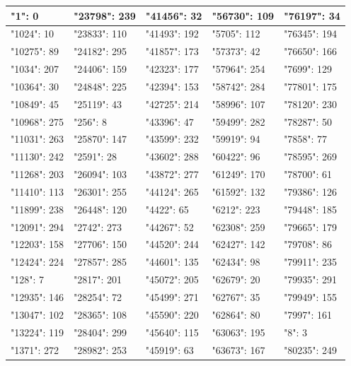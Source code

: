 \documentclass[11pt,letterpaper]{article}
\begin{document}
\begin{enumerate}[label=\alph*)]
\begin{itemize}
\begin{table}[H]
\begin{longtable}{|l|l|l|l|l|}
\hline
"1": 0        & "23798": 239   &  "41456": 32   & "56730": 109  & "76197": 34  \\ \hline
"1024": 10    & "23833": 110   &  "41493": 192  & "5705": 112   & "76345": 194 \\ \hline
"10275": 89   & "24182": 295   &  "41857": 173  & "57373": 42   & "76650": 166 \\ \hline
"1034": 207   & "24406": 159   &  "42323": 177  & "57964": 254  & "7699": 129  \\ \hline
"10364": 30   & "24848": 225   &  "42394": 153  & "58742": 284  & "77801": 175 \\ \hline
"10849": 45   & "25119": 43    &  "42725": 214  & "58996": 107  & "78120": 230 \\ \hline
"10968": 275  & "256": 8       &  "43396": 47   & "59499": 282  & "78287": 50  \\ \hline
"11031": 263  & "25870": 147   &  "43599": 232  & "59919": 94   & "7858": 77   \\ \hline
"11130": 242  & "2591": 28     &  "43602": 288  & "60422": 96   & "78595": 269 \\ \hline
"11268": 203  & "26094": 103   &  "43872": 277  & "61249": 170  & "78700": 61  \\ \hline
"11410": 113  & "26301": 255   &  "44124": 265  & "61592": 132  & "79386": 126 \\ \hline
"11899": 238  & "26448": 120   &  "4422": 65    & "6212": 223   & "79448": 185 \\ \hline
"12091": 294  & "2742": 273    &  "44267": 52   & "62308": 259  & "79665": 179 \\ \hline
"12203": 158  & "27706": 150   &  "44520": 244  & "62427": 142  & "79708": 86  \\ \hline
"12424": 224  & "27857": 285   &  "44601": 135  & "62434": 98   & "79911": 235 \\ \hline
"128": 7      & "2817": 201    &  "45072": 205  & "62679": 20   & "79935": 291 \\ \hline
"12935": 146  & "28254": 72    &  "45499": 271  & "62767": 35   & "79949": 155 \\ \hline
"13047": 102  & "28365": 108   &  "45590": 220  & "62864": 80   & "7997": 161  \\ \hline
"13224": 119  & "28404": 299   &  "45640": 115  & "63063": 195  & "8": 3       \\ \hline
"1371": 272   & "28982": 253   &  "45919": 63   & "63673": 167  & "80235": 249 \\ \hline

\end{longtable}
\end{table}
\end{itemize}
\end{enumerate}
\end{document}

